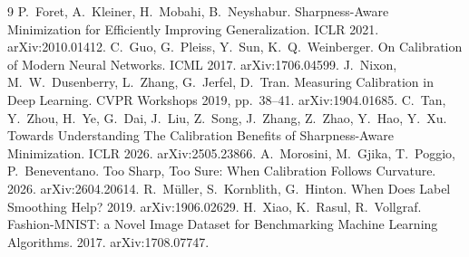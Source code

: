 \documentclass[11pt,letterpaper]{article}
\begin{document}
\begin{thebibliography}{9}
 P.~Foret, A.~Kleiner, H.~Mobahi, B.~Neyshabur. Sharpness-Aware Minimization for Efficiently Improving Generalization. ICLR 2021. arXiv:2010.01412.
 C.~Guo, G.~Pleiss, Y.~Sun, K.~Q.~Weinberger. On Calibration of Modern Neural Networks. ICML 2017. arXiv:1706.04599.
 J.~Nixon, M.~W.~Dusenberry, L.~Zhang, G.~Jerfel, D.~Tran. Measuring Calibration in Deep Learning. CVPR Workshops 2019, pp.~38--41. arXiv:1904.01685.
 C.~Tan, Y.~Zhou, H.~Ye, G.~Dai, J.~Liu, Z.~Song, J.~Zhang, Z.~Zhao, Y.~Hao, Y.~Xu. Towards Understanding The Calibration Benefits of Sharpness-Aware Minimization. ICLR 2026. arXiv:2505.23866.
 A.~Morosini, M.~Gjika, T.~Poggio, P.~Beneventano. Too Sharp, Too Sure: When Calibration Follows Curvature. 2026. arXiv:2604.20614.
 R.~M\"uller, S.~Kornblith, G.~Hinton. When Does Label Smoothing Help? 2019. arXiv:1906.02629.
 H.~Xiao, K.~Rasul, R.~Vollgraf. Fashion-MNIST: a Novel Image Dataset for Benchmarking Machine Learning Algorithms. 2017. arXiv:1708.07747.
\end{thebibliography}
\end{document}

